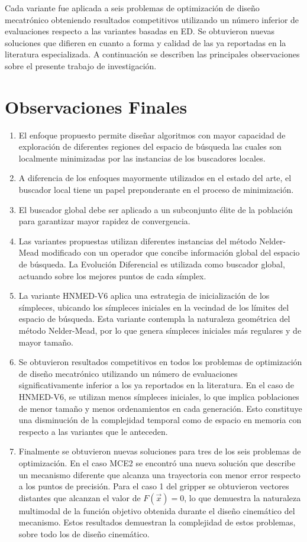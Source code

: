 Cada variante fue aplicada a seis problemas de optimización de diseño mecatrónico obteniendo resultados competitivos utilizando un número inferior de evaluaciones respecto a las variantes basadas en ED. Se obtuvieron nuevas soluciones que difieren en cuanto a forma y calidad de las ya reportadas en la literatura especializada. A continuación se describen las principales observaciones sobre el presente trabajo de investigación.
\section{Observaciones Finales}
\begin{enumerate}
	\item El enfoque propuesto permite diseñar algoritmos con mayor capacidad de exploración de diferentes regiones del espacio de búsqueda las cuales son localmente minimizadas por las instancias de los buscadores locales.
	\item A diferencia de los enfoques mayormente utilizados en el estado del arte, el buscador local tiene un papel preponderante en el proceso de minimización.
	\item El buscador global debe ser aplicado a un subconjunto élite de la población para garantizar mayor rapidez de convergencia.
	 \item Las variantes propuestas utilizan diferentes instancias del método Nelder-Mead modificado con un operador que concibe información global del espacio de búsqueda. La Evolución Diferencial es utilizada como buscador global, actuando sobre los mejores puntos de cada símplex.
	 \item La variante HNMED-V6 aplica una estrategia de inicialización de los símpleces, ubicando los símpleces iniciales en la vecindad de los límites del espacio de búsqueda. Esta variante contempla la naturaleza geométrica del método Nelder-Mead, por lo que genera símpleces iniciales más regulares y de mayor tamaño. 
	 \item Se obtuvieron resultados competitivos en todos los problemas de optimización de diseño mecatrónico utilizando un número de evaluaciones significativamente inferior a los ya reportados en la literatura. En el caso de HNMED-V6, se utilizan menos símpleces iniciales, lo que implica poblaciones de menor tamaño y menos ordenamientos en cada generación. Esto constituye una disminución de la complejidad temporal como de espacio en memoria con respecto a las variantes que le anteceden.
	 
	 \item Finalmente se obtuvieron nuevas soluciones para tres de los seis problemas de optimización. En el  caso MCE2 se encontró una nueva solución que describe un mecanismo diferente que alcanza una trayectoria con menor error respecto a los puntos de precisión. Para el caso 1 del gripper se obtuvieron vectores distantes que alcanzan el valor de $F(\vec{x})=0$, lo que demuestra la naturaleza multimodal de la función objetivo obtenida durante el diseño cinemático del mecanismo. Estos resultados demuestran la complejidad de estos problemas, sobre todo los de diseño cinemático. 
\end{enumerate}  
	 
